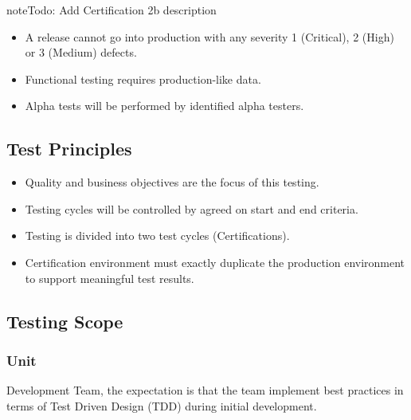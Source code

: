 \documentclass[letterpaper,10pt,english]{sphinxmanual}
\begin{document}
\begin{sphinxadmonition}{note}{\label{test_plan/strategy:index-0}Todo:}
Add Certification 2b description
\end{sphinxadmonition}
\begin{itemize}
\item {} 
A release cannot go into production with any severity 1 (Critical), 2 (High) or 3 (Medium) defects.

\item {} 
Functional testing requires production-like data.

\item {} 
Alpha tests will be performed by identified alpha testers.

\end{itemize}


\subsection{Test Principles}
\label{\detokenize{test_plan/strategy:test-principles}}\begin{itemize}
\item {} 
Quality and business objectives are the focus of this testing.

\item {} 
Testing cycles will be controlled by agreed on start and end criteria.

\item {} 
Testing is divided into two test cycles (Certifications).

\item {} 
Certification environment must exactly duplicate the production environment to support meaningful test results.

\end{itemize}


\subsection{Testing Scope}
\label{\detokenize{test_plan/strategy:testing-scope}}

\subsubsection{Unit}
\label{\detokenize{test_plan/strategy:unit}}
 Development Team, the expectation is that the team implement best practices in terms of Test Driven Design (TDD) during initial development.
\end{document}
